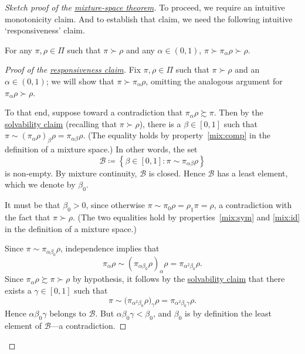 \begin{proof}[Sketch proof of the {\hyperref[theorem:mix]{mixture-space theorem}}]
	To proceed, we require an intuitive monotonicity claim. And to establish that claim, we need the following intuitive `responsiveness' claim.

	\begin{namedthm}
		\label{claim:mix:strict}
		For any $\pi,\rho \in \Pi$ such that $\pi \succ \rho$ and any $\alpha \in (0,1)$, $\pi \succ \pi_\alpha \rho \succ \rho$.
	\end{namedthm}

	\begin{proof}[Proof of the {\hyperref[claim:mix:solv]{responsiveness claim}}]
		\renewcommand{\qedsymbol}{$\square$}
		Fix $\pi,\rho \in \Pi$ such that $\pi \succ \rho$ and an $\alpha \in (0,1)$; we will show that $\pi \succ \pi_\alpha \rho$, omitting the analogous argument for $\pi_\alpha \rho \succ \rho$.

		To that end, suppose toward a contradiction that $\pi_\alpha \rho \succsim \pi$. Then by the \hyperref[claim:mix:solv]{solvability claim} (recalling that $\pi \succ \rho$), there is a $\beta \in [0,1]$ such that $\pi \sim ( \pi_\alpha \rho )_\beta \rho = \pi_{\alpha\beta} \rho$. (The equality holds by property~\ref{mix:comp} in the definition of a mixture space.) In other words, the set
		\begin{equation*}
			\mathcal{B} \coloneqq \left\{ \beta \in [0,1] :
			\pi \sim \pi_{\alpha\beta} \rho
			\right\}
		\end{equation*}
		is non-empty. By mixture continuity, $\mathcal{B}$ is closed. Hence $\mathcal{B}$ has a least element, which we denote by $\beta_0$.

		It must be that $\beta_0>0$, since otherwise $\pi \sim \pi_0 \rho = \rho_1 \pi = \rho$, a contradiction with the fact that $\pi \succ \rho$. (The two equalities hold by properties~\ref{mix:sym} and \ref{mix:id} in the definition of a mixture space.)

		Since $\pi \sim \pi_{\alpha \beta_0} \rho$, independence implies that
		\begin{equation*}
			\pi_\alpha \rho
			\sim ( \pi_{\alpha \beta_0} \rho )_\alpha \rho
			= \pi_{\alpha^2 \beta_0} \rho .
		\end{equation*}
		Since $\pi_\alpha \rho \succsim \pi \succ \rho$ by hypothesis, it follows by the \hyperref[claim:mix:solv]{solvability claim} that there exists a $\gamma \in [0,1]$ such that
		\begin{equation*}
			\pi
			\sim \bigl( \pi_{\alpha^2 \beta_0} \rho \bigr)_\gamma \rho
			= \pi_{\alpha^2 \beta_0 \gamma} \rho .
		\end{equation*}
		Hence $\alpha \beta_0 \gamma$ belongs to $\mathcal{B}$. But $\alpha \beta_0 \gamma < \beta_0$, and $\beta_0$ is by definition the least element of $\mathcal{B}$---a contradiction.
	\end{proof}%
	\renewcommand{\qedsymbol}{$\blacksquare$}


\end{proof}
